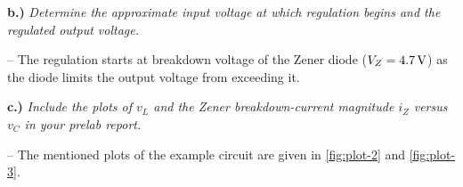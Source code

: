 \vspace{0.5cm}
\textbf{b.) } \textit{Determine the approximate input voltage at which regulation begins and the regulated output voltage.}\par
-- The regulation starts at breakdown voltage of the Zener diode ($V_Z = \qty{4.7}{\volt}$) as the diode limits the output voltage from exceeding it.

\vspace{0.5cm}
\textbf{c.) } \textit{Include the plots of $v_L$ and the Zener breakdown-current magnitude $i_Z$ versus $v_C$ in your prelab report.}\par
-- The mentioned plots of the example circuit are given in \autoref{fig:plot-2} and \autoref{fig:plot-3}.